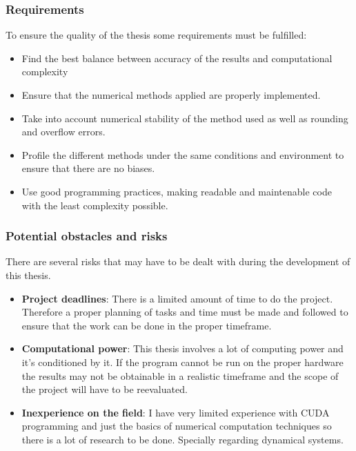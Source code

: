 \subsubsection{Requirements}

To ensure the quality of the thesis some requirements must be fulfilled:

\begin{itemize}
    \item Find the best balance between accuracy of the results and
        computational complexity
    \item Ensure that the numerical methods applied are properly implemented.
    \item Take into account numerical stability of the method used as well as
        rounding and overflow errors.
    \item Profile the different methods under the same conditions and
        environment to ensure that there are no biases.
    \item Use good programming practices, making readable and maintenable code with the least
        complexity possible.
\end{itemize}

\subsubsection{Potential obstacles and risks}

There are several risks that may have to be dealt with during the development
of this thesis.

\begin{itemize}
    \item \textbf{Project deadlines}: There is a limited amount of time to
        do the project. Therefore a proper planning of tasks and time must be
        made and followed to ensure that the work can be done in the proper
        timeframe.
    \item \textbf{Computational power}: This thesis involves a lot of
        computing power and it's conditioned by it. If the program cannot be run
        on the proper hardware the results may not be obtainable in a realistic
        timeframe and the scope of the project will have to be reevaluated.
    \item \textbf{Inexperience on the field}: I have very limited experience
        with CUDA programming and just the basics of numerical computation
        techniques so there is a lot of research to be done. Specially regarding
        dynamical systems.
\end{itemize}

